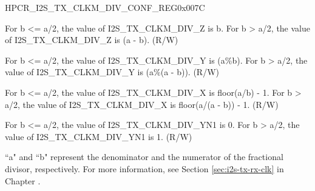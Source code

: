\begin{register}{H}{PCR\_I2S\_TX\_CLKM\_DIV\_CONF\_REG}{0x007C}\label{regdesc:PCRI2STXCLKMDIVCONFREG}
%
%
%
%
%
\regnewline%
\begin{regdesc}\begin{reglist}
\label{fielddesc:PCRI2STXCLKMDIVZ}\item [PCR\_I2S\_TX\_CLKM\_DIV\_Z] For b <= a/2, the value of I2S\_TX\_CLKM\_DIV\_Z is b. For b > a/2, the value of I2S\_TX\_CLKM\_DIV\_Z is (a - b). (R/W)
\label{fielddesc:PCRI2STXCLKMDIVY}\item [PCR\_I2S\_TX\_CLKM\_DIV\_Y] For b <= a/2, the value of I2S\_TX\_CLKM\_DIV\_Y is (a\%b). For b > a/2, the value of I2S\_TX\_CLKM\_DIV\_Y is (a\%(a - b)). (R/W)
\label{fielddesc:PCRI2STXCLKMDIVX}\item [PCR\_I2S\_TX\_CLKM\_DIV\_X] For b <= a/2, the value of I2S\_TX\_CLKM\_DIV\_X is floor(a/b) - 1. For b > a/2, the value of I2S\_TX\_CLKM\_DIV\_X is floor(a/(a - b)) - 1. (R/W)
\label{fielddesc:PCRI2STXCLKMDIVYN1}\item [PCR\_I2S\_TX\_CLKM\_DIV\_YN1] For b <= a/2, the value of I2S\_TX\_CLKM\_DIV\_YN1 is 0. For b > a/2, the value of I2S\_TX\_CLKM\_DIV\_YN1 is 1. (R/W)
\end{reglist}\end{regdesc}
\vspace{-2em}
\begin{tiplisting}
``a" and ``b" represent the denominator and the numerator of the fractional divisor, respectively. For more information, see Section \ref{sec:i2s-tx-rx-clk} in Chapter \textit{}.
\end{tiplisting}
\end{register}


